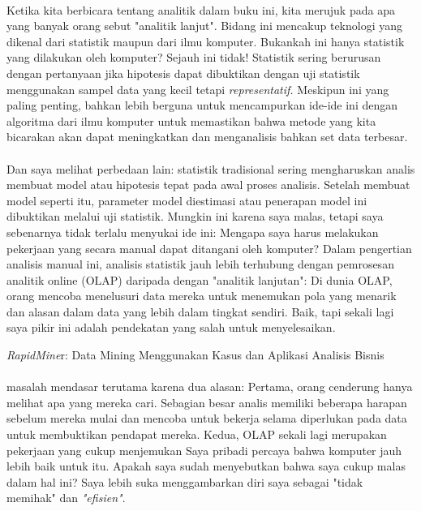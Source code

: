 \paragraph{} Ketika kita berbicara tentang analitik dalam buku ini, kita merujuk pada apa yang banyak orang sebut "analitik lanjut". Bidang ini mencakup teknologi yang dikenal dari statistik maupun dari ilmu komputer. Bukankah ini hanya statistik yang dilakukan oleh komputer? Sejauh ini tidak! Statistik sering berurusan dengan pertanyaan jika hipotesis dapat dibuktikan dengan uji statistik menggunakan sampel data yang kecil tetapi \textit{representatif.} Meskipun ini yang paling penting, bahkan lebih berguna untuk mencampurkan ide-ide ini dengan algoritma dari ilmu komputer untuk memastikan bahwa metode yang kita bicarakan akan dapat meningkatkan dan menganalisis bahkan set data terbesar.

\paragraph{} Dan saya melihat perbedaan lain: statistik tradisional sering mengharuskan analis membuat model atau hipotesis tepat pada awal proses analisis. Setelah membuat model seperti itu, parameter model diestimasi atau penerapan model ini dibuktikan melalui uji statistik. Mungkin ini karena saya malas, tetapi saya sebenarnya tidak terlalu menyukai ide ini: Mengapa saya harus melakukan pekerjaan yang secara manual dapat ditangani oleh komputer? Dalam pengertian analisis manual ini, analisis statistik jauh lebih terhubung dengan pemrosesan analitik online (OLAP) daripada dengan "analitik lanjutan": Di dunia OLAP, orang mencoba menelusuri data mereka untuk menemukan pola yang menarik dan alasan dalam data yang lebih dalam tingkat sendiri. Baik, tapi sekali lagi saya pikir ini adalah pendekatan yang salah untuk menyelesaikan.

   \textit{ RapidMine}r: Data Mining Menggunakan Kasus dan Aplikasi Analisis Bisnis
   
   \paragraph{}  masalah mendasar terutama karena dua alasan: Pertama, orang cenderung hanya melihat apa yang mereka cari. Sebagian besar analis memiliki beberapa harapan sebelum mereka mulai dan mencoba untuk bekerja selama diperlukan pada data untuk membuktikan pendapat mereka. Kedua, OLAP sekali lagi merupakan pekerjaan yang cukup menjemukan Saya pribadi percaya bahwa komputer jauh lebih baik untuk itu. Apakah saya sudah menyebutkan bahwa saya cukup malas dalam hal ini? Saya lebih suka menggambarkan diri saya sebagai "tidak memihak" dan \textit{"efisien"}.
   
